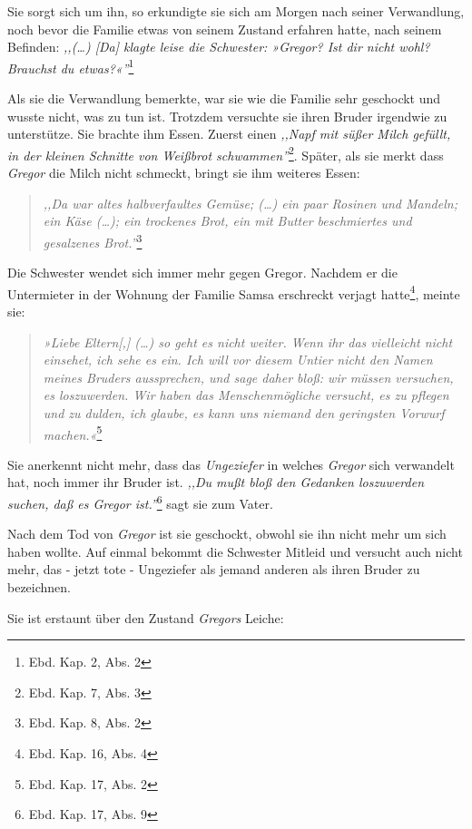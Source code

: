 \documentclass[12pt,a4paper,twoside,titlepage]{article}
\begin{document}
	Sie sorgt sich um ihn, so erkundigte sie sich am Morgen nach seiner Verwandlung, noch bevor die Familie etwas von seinem Zustand erfahren hatte, nach seinem Befinden: \textit{,,(\dots) [Da] klagte leise die Schwester: »Gregor? Ist dir nicht wohl? Brauchst du etwas?«''}\footnote{Ebd. Kap. 2, Abs. 2}
	
	Als sie die Verwandlung bemerkte, war sie wie die Familie sehr geschockt und wusste nicht, was zu tun ist. Trotzdem versuchte sie ihren Bruder irgendwie zu unterstütze. Sie brachte ihm Essen. Zuerst einen \textit{,,Napf mit süßer Milch gefüllt, in der kleinen Schnitte von Weißbrot schwammen''}\footnote{Ebd. Kap. 7, Abs. 3}. Später, als sie merkt dass \textit{Gregor} die Milch nicht schmeckt, bringt sie ihm weiteres Essen: 
	\begin{quote}
		\textit{,,Da war altes halbverfaultes Gemüse; (\dots) ein paar Rosinen und Mandeln; ein Käse (\dots); ein trockenes Brot, ein mit Butter beschmiertes und gesalzenes Brot.''}\footnote{Ebd. Kap. 8, Abs. 2}
	\end{quote}
	
	Die Schwester wendet sich immer mehr gegen Gregor. Nachdem er die Untermieter in der Wohnung der Familie Samsa erschreckt verjagt hatte\footnote{Ebd. Kap. 16, Abs. 4}, meinte sie:
	
	\begin{quote}
		\textit{»Liebe Eltern[,] (\dots) so geht es nicht weiter. Wenn ihr das vielleicht nicht einsehet, ich sehe es ein. Ich will vor diesem Untier nicht den Namen meines Bruders aussprechen, und sage daher bloß: wir müssen versuchen, es loszuwerden. Wir haben das Menschenmögliche versucht, es zu pflegen und zu dulden, ich glaube, es kann uns niemand den geringsten Vorwurf machen.«}\footnote{Ebd. Kap. 17, Abs. 2}
	\end{quote}
	
	Sie anerkennt nicht mehr, dass das \textit{Ungeziefer} in welches \textit{Gregor} sich  verwandelt hat, noch immer ihr Bruder ist. \textit{,,Du mußt bloß den Gedanken loszuwerden suchen, daß es Gregor ist.''}\footnote{Ebd. Kap. 17, Abs. 9} sagt sie zum Vater. 
	
	Nach dem Tod von \textit{Gregor} ist sie geschockt, obwohl sie ihn nicht mehr um sich haben wollte. Auf einmal bekommt die Schwester Mitleid und versucht auch nicht mehr, das - jetzt tote - Ungeziefer als jemand anderen als ihren Bruder zu bezeichnen.
	
	Sie ist erstaunt über den Zustand \textit{Gregors} Leiche: 
	
\end{document}
